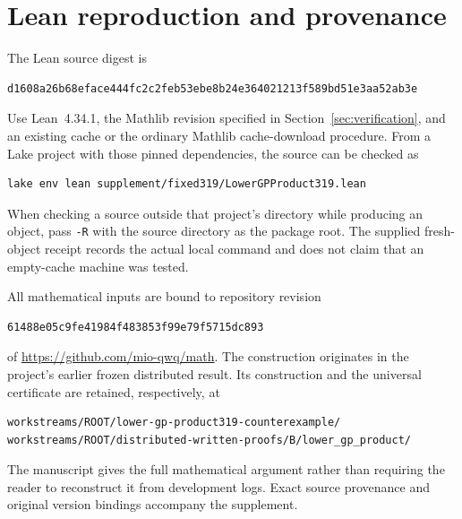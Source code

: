 \documentclass[11pt]{article}
\theoremstyle{definition}
\theoremstyle{remark}
\begin{document}
\section{Lean reproduction and provenance}\label{app:lean}

The Lean source digest is
\begin{lstlisting}[basicstyle=\ttfamily\footnotesize]
d1608a26b68eface444fc2c2feb53ebe8b24e364021213f589bd51e3aa52ab3e
\end{lstlisting}
Use Lean~4.34.1, the Mathlib revision specified in
Section~\ref{sec:verification}, and an existing cache or the ordinary
Mathlib cache-download procedure. From a Lake project with those pinned
dependencies, the source can be checked as
\begin{lstlisting}
lake env lean supplement/fixed319/LowerGPProduct319.lean
\end{lstlisting}
When checking a source outside that project's directory while producing
an object, pass \texttt{-R} with the source directory as the package root.
The supplied fresh-object receipt records the actual local command and
does not claim that an empty-cache machine was tested.

All mathematical inputs are bound to repository revision
\begin{lstlisting}[basicstyle=\ttfamily\footnotesize]
61488e05c9fe41984f483853f99e79f5715dc893
\end{lstlisting}
of \url{https://github.com/mio-qwq/math}. The construction originates in
the project's earlier frozen distributed result. Its construction and
the universal certificate are retained, respectively, at
\begin{lstlisting}[basicstyle=\ttfamily\footnotesize]
workstreams/ROOT/lower-gp-product319-counterexample/
workstreams/ROOT/distributed-written-proofs/B/lower_gp_product/
\end{lstlisting}
The manuscript gives the full mathematical argument rather than requiring
the reader to reconstruct it from development logs. Exact source provenance
and original version bindings accompany the supplement.
\end{document}
